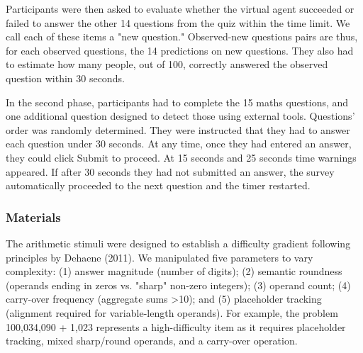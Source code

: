 \documentclass[10pt,letterpaper]{article}
\begin{document}
Participants were then asked to evaluate whether the virtual agent succeeded or failed to answer the other 14 questions from the quiz within the time limit. We call each of these items a "new question." Observed-new questions pairs are thus, for each observed questions, the 14 predictions on new questions. They also had to estimate how many people, out of 100, correctly answered the observed question within 30 seconds.

In the second phase, participants had to complete the 15 maths questions, and one additional question designed to detect those using external tools. Questions' order was randomly determined. They were instructed that they had to answer each question under 30 seconds. At any time, once they had entered an answer, they could click Submit to proceed. At 15 seconds and 25 seconds time warnings appeared. If after 30 seconds they had not submitted an answer, the survey automatically proceeded to the next question and the timer restarted.

\subsubsection{Materials}\label{materials}

The arithmetic stimuli were designed to establish a difficulty gradient following principles by Dehaene (2011). We manipulated five parameters to vary complexity: (1) answer magnitude (number of digits); (2) semantic roundness (operands ending in zeros vs. "sharp" non-zero integers); (3) operand count; (4) carry-over frequency (aggregate sums >10); and (5) placeholder tracking (alignment required for variable-length operands). For example, the problem 100,034,090 + 1,023 represents a high-difficulty item as it requires placeholder tracking, mixed sharp/round operands, and a carry-over operation.
\end{document}
